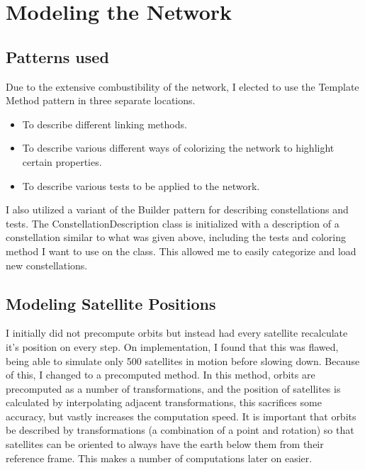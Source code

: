 \documentclass[12pt,a4paper,twoside,openright]{report}
\begin{document}
\section{Modeling the Network}

\subsection{Patterns used}

Due to the extensive combustibility of the network, I elected to use the Template Method pattern in three separate locations.

\begin{itemize}
\item To describe different linking methods.
\item To describe various different ways of colorizing the network to highlight certain properties.
\item To describe various tests to be applied to the network.
\end{itemize}

I also utilized a variant of the Builder pattern for describing constellations and tests. The ConstellationDescription class is initialized with a description of a constellation similar to what was given above, including the tests and coloring method I want to use on the class. This allowed me to easily categorize and load new constellations.


\subsection{Modeling Satellite Positions}
I initially did not precompute orbits but instead had every satellite recalculate it's position on every step. On implementation, I found that this was flawed, being able to simulate only 500 satellites in motion before slowing down. Because of this, I changed to a precomputed method. In this method, orbits are precomputed as a number of transformations, and the position of satellites is calculated by interpolating adjacent transformations, this sacrifices some accuracy, but vastly increases the computation speed. It is important that orbits be described by transformations (a combination of a point and rotation) so that satellites can be oriented to always have the earth below them from their reference frame. This makes a number of computations later on easier.
\end{document}
